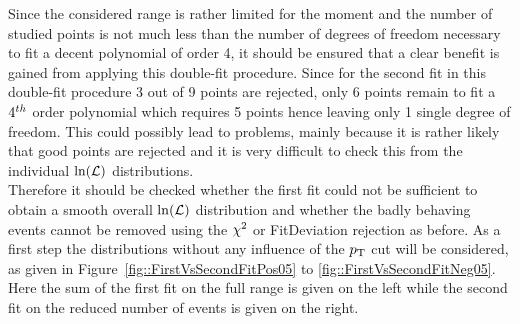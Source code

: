 Since the considered range is rather limited for the moment and the number of studied points is not much less than the number of degrees of freedom necessary to fit a decent polynomial of order 4, it should be ensured that a clear benefit is gained from applying this double-fit procedure.
Since for the second fit in this double-fit procedure 3 out of 9 points are rejected, only 6 points remain to fit a $4^{th}$ order polynomial which requires 5 points hence leaving only 1 single degree of freedom. This could possibly lead to problems, mainly because it is rather likely that good points are rejected and it is very difficult to check this from the individual $\ln(\mathcal{L})$ distributions.
\\

Therefore it should be checked whether the first fit could not be sufficient to obtain a smooth overall $\ln(\mathcal{L})$ distribution and whether the badly behaving events cannot be removed using the $\chi^{2}$ or FitDeviation rejection as before.
As a first step the distributions without any influence of the $p_{\textrm T}$ cut will be considered, as given in Figure~\ref{fig::FirstVsSecondFitPos05} to \ref{fig::FirstVsSecondFitNeg05}. Here the sum of the first fit on the full range is given on the left while the second fit on the reduced number of events is given on the right.

